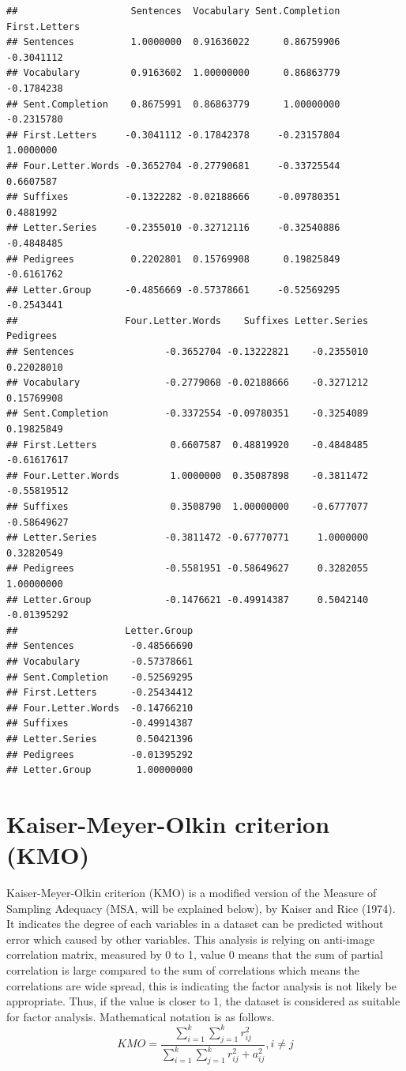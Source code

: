 \documentclass[]{book}
\begin{document}
\begin{verbatim}
##                    Sentences  Vocabulary Sent.Completion First.Letters
## Sentences          1.0000000  0.91636022      0.86759906    -0.3041112
## Vocabulary         0.9163602  1.00000000      0.86863779    -0.1784238
## Sent.Completion    0.8675991  0.86863779      1.00000000    -0.2315780
## First.Letters     -0.3041112 -0.17842378     -0.23157804     1.0000000
## Four.Letter.Words -0.3652704 -0.27790681     -0.33725544     0.6607587
## Suffixes          -0.1322282 -0.02188666     -0.09780351     0.4881992
## Letter.Series     -0.2355010 -0.32712116     -0.32540886    -0.4848485
## Pedigrees          0.2202801  0.15769908      0.19825849    -0.6161762
## Letter.Group      -0.4856669 -0.57378661     -0.52569295    -0.2543441
##                   Four.Letter.Words    Suffixes Letter.Series   Pedigrees
## Sentences                -0.3652704 -0.13222821    -0.2355010  0.22028010
## Vocabulary               -0.2779068 -0.02188666    -0.3271212  0.15769908
## Sent.Completion          -0.3372554 -0.09780351    -0.3254089  0.19825849
## First.Letters             0.6607587  0.48819920    -0.4848485 -0.61617617
## Four.Letter.Words         1.0000000  0.35087898    -0.3811472 -0.55819512
## Suffixes                  0.3508790  1.00000000    -0.6777077 -0.58649627
## Letter.Series            -0.3811472 -0.67770771     1.0000000  0.32820549
## Pedigrees                -0.5581951 -0.58649627     0.3282055  1.00000000
## Letter.Group             -0.1476621 -0.49914387     0.5042140 -0.01395292
##                   Letter.Group
## Sentences          -0.48566690
## Vocabulary         -0.57378661
## Sent.Completion    -0.52569295
## First.Letters      -0.25434412
## Four.Letter.Words  -0.14766210
## Suffixes           -0.49914387
## Letter.Series       0.50421396
## Pedigrees          -0.01395292
## Letter.Group        1.00000000
\end{verbatim}

\hypertarget{kaiser-meyer-olkin-criterion-kmo}{%
\section{Kaiser-Meyer-Olkin criterion (KMO)}\label{kaiser-meyer-olkin-criterion-kmo}}

Kaiser-Meyer-Olkin criterion (KMO) is a modified version of the Measure of Sampling Adequacy (MSA, will be explained below), by Kaiser and Rice (1974). It indicates the degree of each variables in a dataset can be predicted without error which caused by other variables. This analysis is relying on anti-image correlation matrix, measured by 0 to 1, value 0 means that the sum of partial correlation is large compared to the sum of correlations which means the correlations are wide spread, this is indicating the factor analysis is not likely be appropriate. Thus, if the value is closer to 1, the dataset is considered as suitable for factor analysis.
Mathematical notation is as follows.
\[
KMO =  \frac {\sum_{i=1}^k \sum_{j=1}^k r_{ij}^2} {\sum_{i=1}^k \sum_{j=1}^k r_{ij}^2 + a_{ij}^2} ,   i\ne j
\]
\end{document}
